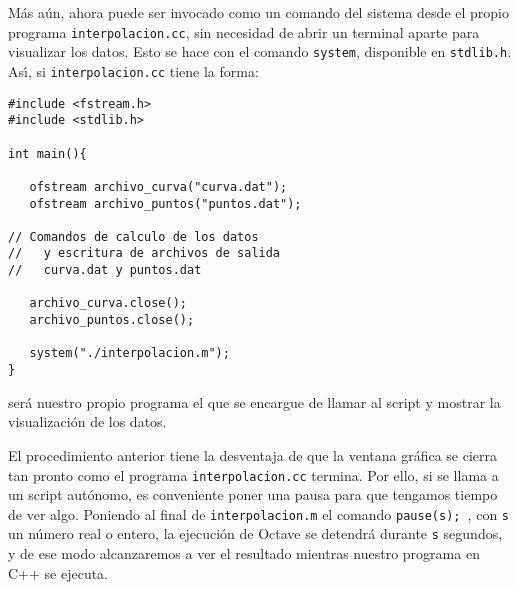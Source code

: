 \documentclass[12pt]{article}
\begin{document}
M\'as a\'un, ahora puede ser invocado como un comando del sistema
desde el propio programa \verb+interpolacion.cc+, sin necesidad de
abrir un terminal aparte para visualizar los datos. Esto se hace con
el comando \verb+system+, disponible en \verb+stdlib.h+. As\'{\i}, 
si \verb+interpolacion.cc+ tiene la forma:
\begin{verbatim}
#include <fstream.h>
#include <stdlib.h>

int main(){

   ofstream archivo_curva("curva.dat");
   ofstream archivo_puntos("puntos.dat");

// Comandos de calculo de los datos
//   y escritura de archivos de salida
//   curva.dat y puntos.dat

   archivo_curva.close();
   archivo_puntos.close();

   system("./interpolacion.m");
}
\end{verbatim}
ser\'a nuestro propio programa el que se encargue de llamar al script
y mostrar la visualizaci\'on de los datos. 

El procedimiento anterior tiene la desventaja de que la ventana
gr\'afica se cierra tan pronto como el programa
\verb+interpolacion.cc+ termina. Por ello, si se llama a un script
aut\'onomo, es conveniente poner una pausa para que tengamos tiempo de
ver algo. Poniendo al final de \verb+interpolacion.m+ el comando
\verb+pause(s); +, con \verb+s+ un n\'umero real o entero, la
ejecuci\'on de Octave se detendr\'a durante \verb+s+ segundos, y de
ese modo alcanzaremos a ver el resultado mientras nuestro programa en
C++ se ejecuta.
\end{document}
